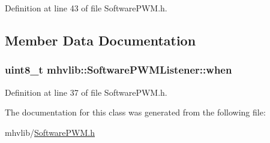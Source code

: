 Definition at line 43 of file Software\-P\-W\-M.\-h.



\subsection{Member Data Documentation}
\hypertarget{classmhvlib_1_1_software_p_w_m_listener_ac85d0da4b6a15ec400979461fc1ad919}{
\subsubsection[{when}]{\setlength{\rightskip}{0pt plus 5cm}uint8\-\_\-t mhvlib\-::\-Software\-P\-W\-M\-Listener\-::when}}\label{classmhvlib_1_1_software_p_w_m_listener_ac85d0da4b6a15ec400979461fc1ad919}


Definition at line 37 of file Software\-P\-W\-M.\-h.



The documentation for this class was generated from the following file\-:\begin{DoxyCompactItemize}
\item 
mhvlib/\hyperlink{_software_p_w_m_8h}{Software\-P\-W\-M.\-h}\end{DoxyCompactItemize}
